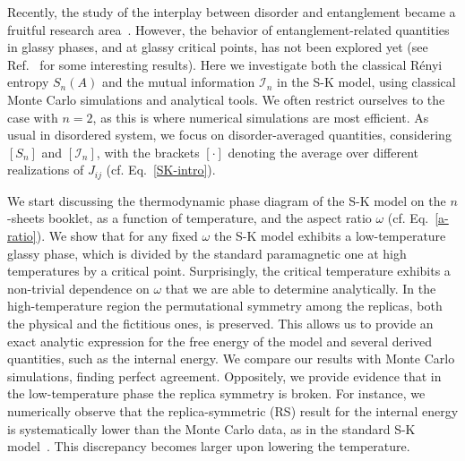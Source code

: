 \documentclass[twocolumn,superscriptaddress,prb,10pt]{revtex4-1}
\begin{document}
Recently, the study of the interplay between disorder and entanglement became a fruitful 
research area~\cite{refael-2009}. However, the behavior of entanglement-related quantities 
in glassy phases, and at glassy critical points, has not been explored yet (see 
Ref.~ for some interesting results). Here we investigate 
both the classical R\'enyi entropy $S_n(A)$ and the mutual information ${\mathcal I}_n$ 
in the S-K model, using classical Monte Carlo simulations and analytical tools. We often 
restrict ourselves to the case with $n=2$, as this is where numerical simulations are 
most efficient. As usual in disordered system, we focus on disorder-averaged quantities, 
considering $[S_n]$ and $[{\mathcal I}_n]$, with the brackets $[\cdot]$ denoting the 
average over different realizations of $J_{ij}$ (cf. Eq.~\eqref{SK-intro}).

We start discussing the thermodynamic phase diagram of the S-K model on the $n$-sheets 
booklet, as a function of temperature, and the aspect ratio $\omega$ (cf. Eq.~\eqref{a-ratio}). 
We show that for any fixed $\omega$ the S-K model exhibits a low-temperature glassy phase, 
which is divided by the standard paramagnetic one at high temperatures by a critical point. 
Surprisingly, the critical temperature exhibits a non-trivial dependence on $\omega$ 
that we are able to determine analytically. 
In the high-temperature region the permutational symmetry among the replicas, both the 
physical and the fictitious ones, is preserved. This allows us to provide an exact analytic 
expression for the free energy of the model and several derived quantities, such as the internal 
energy. We compare our results with Monte Carlo simulations, finding perfect agreement. 
Oppositely, we provide evidence that in the low-temperature phase the replica symmetry is  
broken. For instance, we numerically observe that the replica-symmetric (RS) result for the 
internal energy is systematically lower than the Monte Carlo data, as in the standard 
S-K model~\cite{sherrington-1978-prl,sherrington-1978}. This discrepancy becomes larger 
upon lowering the temperature.  
\end{document}
